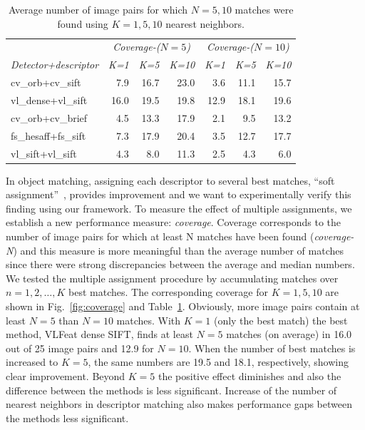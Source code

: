 \documentclass[review]{elsarticle}
\begin{document}
\begin{table}[]
\centering
\caption{Average number of image pairs for which $N=5,10$ matches were found using $K=1,5,10$ nearest neighbors.}
\label{tab:coverage}
\begin{tabular}{lrrrrrr}
\toprule
                    & \multicolumn{3}{c}{{\em Coverage-($N=5$)}} & \multicolumn{3}{c}{{\em Coverage-($N=10$)}} \\
{\em Detector+descriptor} & {\em K=1}      & {\em K=5}      & {\em K=10}     & {\em K=1}      & {\em K=5}      & {\em K=10}      \\ \midrule
cv\_orb+cv\_sift    &    7.9      &     16.7     &       23.0   &       3.6   &     11.1     &       15.7    \\
vl\_dense+vl\_sift  & 16.0         &     19.5     &     19.8     &      12.9    &   18.1       &    19.6       \\
cv\_orb+cv\_brief   &    4.5      &     13.3     &      17.9    &      2.1    &     9.5     &     13.2      \\
fs\_hesaff+fs\_sift &    7.3      &       17.9   &     20.4     &        3.5  &      12.7    &     17.7      \\
vl\_sift+vl\_sift   &     4.3     &       8.0   &         11.3 &       2.5   &    4.3      &     6.0      \\ 
\bottomrule
\end{tabular}
\end{table}
%
In object matching, assigning each descriptor to several best matches,
``soft assignment''~\cite{AgaTri:2008,TuySch:2007,ChaLemVed:2011},
provides improvement and we want to experimentally verify this
finding using our framework. To measure the effect of multiple assignments, we
establish a new performance measure: \textit{coverage}. Coverage
corresponds to the number of image pairs for which at least N matches
have been found ({\em coverage-N}) and this measure is more meaningful
than the average number of matches since there were strong discrepancies
between the average and median numbers.
We tested the multiple assignment procedure by accumulating matches over
$n = 1, 2, \ldots, K$ best matches. The corresponding coverage for
$K = 1, 5, 10$ are shown in Fig.~\ref{fig:coverage} and Table~\ref{tab:coverage}. Obviously,
more image pairs contain at least $N=5$ than $N=10$ matches.
With $K=1$ (only the best match) the best method, VLFeat dense SIFT,
finds at least $N=5$ matches (on average) in 16.0 out of
25 image pairs and 12.9 for $N=10$. When the number of best
matches is increased to $K=5$, the same numbers are 19.5 and 18.1, respectively,
showing clear improvement. Beyond $K=5$ the positive effect diminishes and
also the difference between the methods is less significant. Increase of
the number of nearest neighbors in descriptor matching also makes performance
gaps between the methods less significant.
\end{document}
